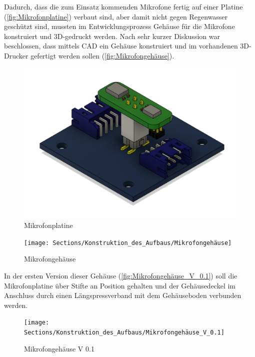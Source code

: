 Dadurch, dass die zum Einsatz kommenden Mikrofone fertig auf einer Platine (\autoref{fig:Mikrofonplatine}) verbaut sind, aber damit nicht gegen Regenwasser geschützt sind, mussten im Entwicklungsprozess Gehäuse für die Mikrofone konstruiert und 3D-gedruckt werden. Nach sehr kurzer Diskussion war beschlossen, dass mittels CAD ein Gehäuse konstruiert und im vorhandenen 3D-Drucker gefertigt werden sollen (\autoref{fig:Mikrofongehäuse}).

\begin{figure}[h]
	\begin{center}
		\includegraphics[scale=0.25]{Sections/Konstruktion_des_Aufbaus/Mikrofonplatine}
	\end{center}
	\caption{Mikrofonplatine}
	\label{fig:Mikrofonplatine}
\end{figure}

\newpage

\begin{figure}[h]
	\begin{center}
		\texttt{[image: Sections/Konstruktion\_des\_Aufbaus/Mikrofongehäuse]}
	\end{center}
	\caption{Mikrofongehäuse}
	\label{fig:Mikrofongehäuse}
\end{figure}

In der ersten Version dieser Gehäuse (\autoref{fig:Mikrofongehäuse_V_0.1}) soll die Mikrofonplatine über Stifte an Position gehalten und der Gehäusedeckel im Anschluss durch einen Längspressverband mit dem Gehäuseboden verbunden werden.

\begin{figure}[h]
	\begin{center}
		\texttt{[image: Sections/Konstruktion\_des\_Aufbaus/Mikrofongehäuse\_V\_0.1]}
	\end{center}
	\caption{Mikrofongehäuse V 0.1}
	\label{fig:Mikrofongehäuse_V_0.1}
\end{figure}



